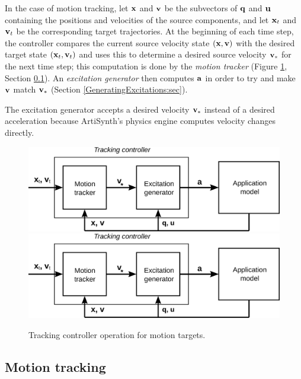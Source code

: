 In the case of motion tracking, let ${\bf x}$ and ${\bf v}$ be the subvectors of ${\bf q}$ and
${\bf u}$ containing the positions and velocities of the source components, and let
${\bf x}_t$ and ${\bf v}_t$ be the corresponding target trajectories. At the beginning of
each time step, the controller compares the current source velocity state
$({\bf x}, {\bf v})$ with the desired target state $({\bf x}_t, {\bf v}_t)$ and uses this to
determine a desired source velocity ${\bf v}_*$ for the next time step;
this computation is done by the {\it motion tracker} (Figure
\ref{trackingController:fig}, Section \ref{MotionTracking:sec}).
An {\it excitation generator} then computes ${\bf a}$ in order to try and make ${\bf v}$
match ${\bf v}_*$ (Section \ref{GeneratingExcitations:sec}).

\begin{sideblock}
The excitation generator accepts a desired velocity ${\bf v}_*$ instead of a desired
acceleration because ArtiSynth's physics engine computes velocity changes
directly.
\end{sideblock}

\begin{figure}[ht]
\begin{center}
\iflatexml
   \includegraphics[]{images/trackingController}
\else
   \includegraphics[width=5in]{images/trackingController}
\fi
\end{center}
\caption{Tracking controller operation for motion targets.}
\label{trackingController:fig}
\end{figure}

\subsection{Motion tracking}
\label{MotionTracking:sec}

